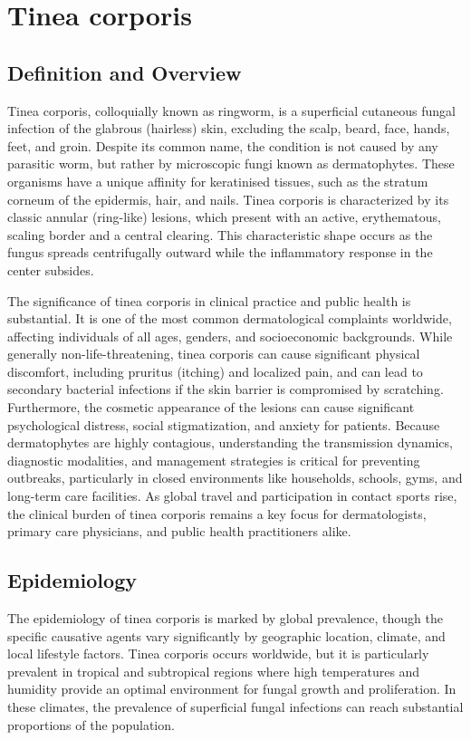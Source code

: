 \chapter{Tinea corporis}

\section*{Definition and Overview}
Tinea corporis, colloquially known as ringworm, is a superficial cutaneous fungal infection of the glabrous (hairless) skin, excluding the scalp, beard, face, hands, feet, and groin. Despite its common name, the condition is not caused by any parasitic worm, but rather by microscopic fungi known as dermatophytes. These organisms have a unique affinity for keratinised tissues, such as the stratum corneum of the epidermis, hair, and nails. Tinea corporis is characterized by its classic annular (ring-like) lesions, which present with an active, erythematous, scaling border and a central clearing. This characteristic shape occurs as the fungus spreads centrifugally outward while the inflammatory response in the center subsides.

The significance of tinea corporis in clinical practice and public health is substantial. It is one of the most common dermatological complaints worldwide, affecting individuals of all ages, genders, and socioeconomic backgrounds. While generally non-life-threatening, tinea corporis can cause significant physical discomfort, including pruritus (itching) and localized pain, and can lead to secondary bacterial infections if the skin barrier is compromised by scratching. Furthermore, the cosmetic appearance of the lesions can cause significant psychological distress, social stigmatization, and anxiety for patients. Because dermatophytes are highly contagious, understanding the transmission dynamics, diagnostic modalities, and management strategies is critical for preventing outbreaks, particularly in closed environments like households, schools, gyms, and long-term care facilities. As global travel and participation in contact sports rise, the clinical burden of tinea corporis remains a key focus for dermatologists, primary care physicians, and public health practitioners alike.

\section*{Epidemiology}
The epidemiology of tinea corporis is marked by global prevalence, though the specific causative agents vary significantly by geographic location, climate, and local lifestyle factors. Tinea corporis occurs worldwide, but it is particularly prevalent in tropical and subtropical regions where high temperatures and humidity provide an optimal environment for fungal growth and proliferation. In these climates, the prevalence of superficial fungal infections can reach substantial proportions of the population.

